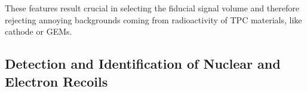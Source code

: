 \documentclass[physics,article,submit,moreauthors,pdftex]{Definitions/mdpi}
\newcommand{\keV}{\ensuremath{\,\textrm{keV}}\xspace}
\newcommand{\eV}{\ensuremath{\,\textrm{eV}}\xspace}
\begin{document}
These features result crucial in selecting the fiducial signal volume and therefore rejecting annoying backgrounds coming from radioactivity of TPC materials, like cathode or GEMs.










\subsection{Detection and Identification of Nuclear and Electron Recoils}
\label{sect:rej}
\end{document}
